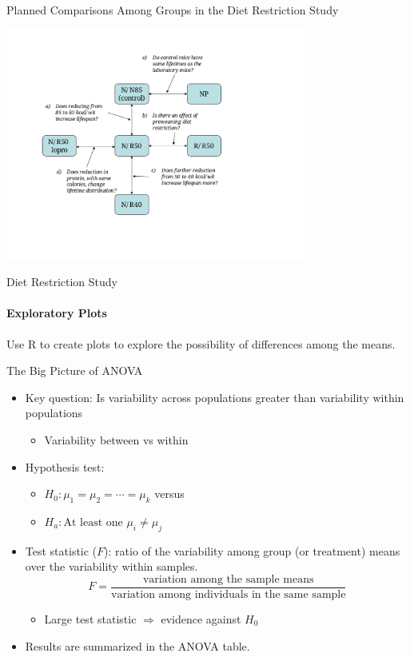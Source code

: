 \documentclass[t,xcolor=pdftex,dvipsnames,table,handout]{beamer}
\newcommand{\bi}{\begin{itemize}}
\newcommand{\ei}{\end{itemize}}
\begin{document}
\begin{frame}{Planned Comparisons Among Groups in the Diet
Restriction Study}

\includegraphics[height=3in]{planned_comps.pdf}


\end{frame}
\begin{frame}{Diet Restriction Study}
\framesubtitle{Exploratory Plots}

\begin{block}{}
Use R to create plots to explore the possibility of differences
among the means.
\end{block}
\end{frame}
\begin{frame}{The Big Picture of ANOVA}
\bi
    \item \alert{Key question:} Is variability \alert{across} populations
    greater than variability \alert{within} populations
    \bi
        \item Variability \alert{between} vs \alert{within}
    \ei
    \pause
    \item \alert{Hypothesis test:}
    \bi
        \item $H_0:\mu_1=\mu_2=\cdots=\mu_k$ versus \pause
        \item $H_a: \mbox{At least one } \mu_i\neq\mu_j$
    \ei
    \pause
    \item \alert{Test statistic ($F$):} ratio of the variability
      \alert{among} group (or treatment)
means over the variability \alert{within} samples.
$$
F=\frac{\mbox{variation among the sample means}}{\mbox{variation among
    individuals in the same sample}}
$$
    \bi
        \item Large test statistic $\Rightarrow$ evidence against
        $H_0$
    \ei
    \pause
    \item Results are summarized in the ANOVA table.

\ei

\end{frame}
\end{document}
